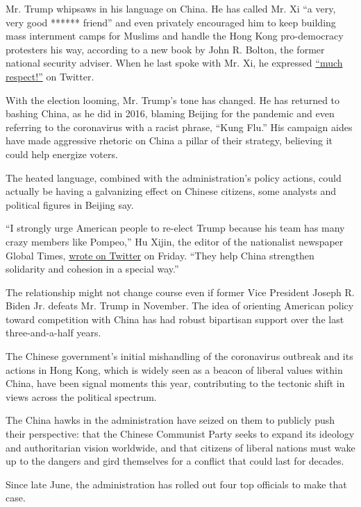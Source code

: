 Mr. Trump whipsaws in his language on China. He has called Mr. Xi ``a
very, very good ****** friend'' and even privately encouraged him to
keep building mass internment camps for Muslims and handle the Hong Kong
pro-democracy protesters his way, according to a new book by John R.
Bolton, the former national security adviser. When he last spoke with
Mr. Xi, he expressed
\href{https://twitter.com/realdonaldtrump/status/1243407157321560071?lang=en}{``much
respect!''} on Twitter.

With the election looming, Mr. Trump's tone has changed. He has returned
to bashing China, as he did in 2016, blaming Beijing for the pandemic
and even referring to the coronavirus with a racist phrase, ``Kung
Flu.'' His campaign aides have made aggressive rhetoric on China a
pillar of their strategy, believing it could help energize voters.

The heated language, combined with the administration's policy actions,
could actually be having a galvanizing effect on Chinese citizens, some
analysts and political figures in Beijing say.

``I strongly urge American people to re-elect Trump because his team has
many crazy members like Pompeo,'' Hu Xijin, the editor of the
nationalist newspaper Global Times,
\href{https://twitter.com/huxijin_gt/status/1286362851527950336}{wrote
on Twitter} on Friday. ``They help China strengthen solidarity and
cohesion in a special way.''

The relationship might not change course even if former Vice President
Joseph R. Biden Jr. defeats Mr. Trump in November. The idea of orienting
American policy toward competition with China has had robust bipartisan
support over the last three-and-a-half years.

The Chinese government's initial mishandling of the coronavirus outbreak
and its actions in Hong Kong, which is widely seen as a beacon of
liberal values within China, have been signal moments this year,
contributing to the tectonic shift in views across the political
spectrum.

The China hawks in the administration have seized on them to publicly
push their perspective: that the Chinese Communist Party seeks to expand
its ideology and authoritarian vision worldwide, and that citizens of
liberal nations must wake up to the dangers and gird themselves for a
conflict that could last for decades.

Since late June, the administration has rolled out four top officials to
make that case.

